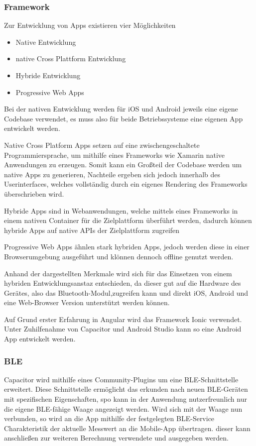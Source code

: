 \subsubsection{Framework}
Zur Entwicklung von Apps existieren vier Möglichkeiten 
\begin{itemize}
	\item Native Entwicklung
	\item native Cross Plattform Entwicklung
	\item Hybride Entwicklung 
	\item Progressive Web Apps
\end{itemize}

Bei der nativen Entwicklung werden für iOS und Android jeweils eine eigene Codebase verwendet, es muss also für beide Betriebssysteme eine eigenen App entwickelt werden.

Native Cross Platform Apps setzen auf eine zwischengeschaltete Programmiersprache, um mithilfe eines Frameworks wie Xamarin native Anwendungen zu erzeugen. Somit kann ein Großteil der Codebase werden um native Apps zu generieren, Nachteile ergeben sich jedoch innerhalb des Userinterfaces, welches vollständig durch ein eigenes Rendering des Frameworks überschrieben wird.

Hybride Apps sind in Webanwendungen, welche mittels eines Frameworks in einem nativen Container für die Zielplattform überführt werden, dadurch können hybride Apps auf native APIs der Zielplattform zugreifen

Progressive Web Apps ähnlen stark hybriden Apps, jedoch werden diese in einer Browserumgebung ausgeführt und klönnen dennoch offline genutzt werden.

Anhand der dargestellten Merkmale wird sich für das Einsetzen von einem hybriden Entwicklungsanstaz entschieden, da dieser gut auf die Hardware des Gerätes, also das Bluetooth-Modul,zugreifen kann und direkt iOS, Android und eine Web-Browser Version unterstützt werden können. 

Auf Grund erster Erfahrung in Angular wird das Framework Ionic verwendet. Unter Zuhilfenahme von Capacitor und Android Studio kann so eine Android App entwickelt werden. 
 
\subsubsection{BLE}

Capacitor wird mithilfe eines Community-Plugins um eine \ac{BLE}-Schnittstelle erweitert. Diese Schnittstelle ermöglicht das erkunden nach neuen BLE-Geräten mit spezifischen Eigenschaften, spo kann in der Anwendung nutzerfreunlich nur die eigene \ac{BLE}-fähige Waage angezeigt werden. Wird sich mit der Waage nun verbunden, so wird an die App mithilfe der festgelegten \ac{BLE}-Service Charakteristik der aktuelle Messwert an die Mobile-App übertragen. dieser kann anschließen zur weiteren Berechnung verwendete und ausgegeben werden.

